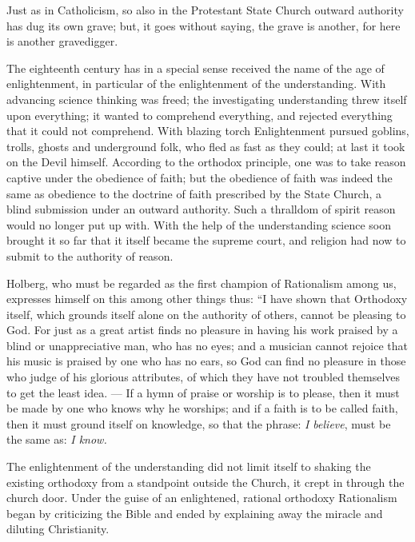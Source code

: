 \documentclass[12pt,a4paper,openany]{book}
\newcommand{\opage}[1]{\marginnote{\footnotesize\textit{[#1]}}}
\begin{document}
Just as in Catholicism, so also in the
Protestant State Church outward authority has dug
its own grave; but, it goes without saying, the grave is
another, for here is another gravedigger.

The eighteenth century has in a special sense
received the name of the age of enlightenment, in particular of the enlightenment of the understanding.
With advancing science thinking was freed;
the investigating understanding threw itself upon everything; it wanted to comprehend everything, and rejected everything that
it could not comprehend. With blazing torch
Enlightenment pursued goblins, trolls, ghosts and
underground folk, who fled as fast as they could; at last
it took on the Devil himself. According to the orthodox
principle, one was to take reason captive under
the obedience of faith; but the obedience of faith was indeed the
same as obedience to the doctrine of faith prescribed by the State Church, a blind submission under an
outward authority. Such a thralldom of spirit
reason would no longer put up with. With the help of the understanding science soon brought it so far that it
\setcounter{footnote}{0}%
\opage{82}itself became the supreme court, and religion had now to
submit to the authority of reason.

Holberg, who must be regarded as the first champion of Rationalism
among us, expresses himself on this among
other things thus: ``I have shown that Orthodoxy itself,
which grounds itself alone on the authority of others, cannot
be pleasing to God. For just as a great artist
finds no pleasure in having his work praised by
a blind or unappreciative man, who has no eyes;
and a musician cannot rejoice that his music is
praised by one who has no ears, so God can find no
pleasure in those who judge of his glorious
attributes, of which they have not troubled themselves to get the
least idea. --- If a hymn of praise or worship is to please,
then it must be made by one who knows why
he worships; and if a faith is to be called faith, then it must
ground itself on knowledge, so that the phrase: \emph{I
believe}, must be the same as: \emph{I know.}

The enlightenment of the understanding did not limit itself to
shaking the existing orthodoxy from a standpoint
outside the Church, it crept in through the church door.
Under the guise of an enlightened, rational orthodoxy
Rationalism began by criticizing the Bible and ended
by explaining away the miracle and diluting Christianity.
\end{document}
